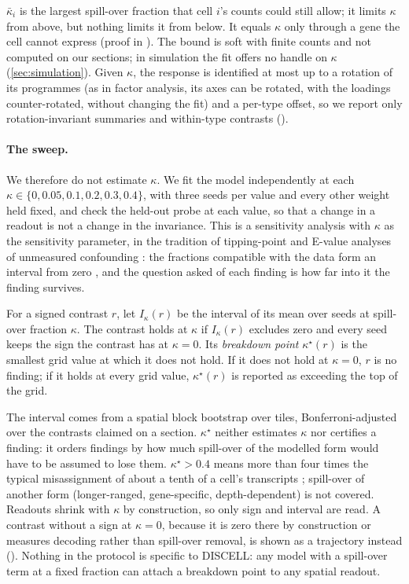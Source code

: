 \noindent $\bar\kappa_i$ is the largest spill-over fraction that cell $i$'s counts could still allow; it limits $\kappa$ from above, but nothing limits it from below. It equals $\kappa$ only through a gene the cell cannot express (proof in ). The bound is soft with finite counts and not computed on our sections; in simulation the fit offers no handle on $\kappa$ (\cref{sec:simulation}). Given $\kappa$, the response is identified at most up to a rotation of its programmes (as in factor analysis, its axes can be rotated, with the loadings counter-rotated, without changing the fit) and a per-type offset, so we report only rotation-invariant summaries and within-type contrasts ().

\paragraph{The sweep.}
We therefore do not estimate $\kappa$. We fit the model independently at each $\kappa \in \{0, 0.05, 0.1, 0.2, 0.3, 0.4\}$, with three seeds per value and every other weight held fixed, and check the held-out probe at each value, so that a change in a readout is not a change in the invariance. This is a sensitivity analysis with $\kappa$ as the sensitivity parameter, in the tradition of tipping-point and E-value analyses of unmeasured confounding \citep{rosenbaum2002,vanderweele2017}: the fractions compatible with the data form an interval from zero \citep{manski2003}, and the question asked of each finding is how far into it the finding survives.

\begin{definition}\label{def:breakdown}
For a signed contrast $r$, let $I_\kappa(r)$ be the interval of its mean over seeds at spill-over fraction $\kappa$. The contrast holds at $\kappa$ if $I_\kappa(r)$ excludes zero and every seed keeps the sign the contrast has at $\kappa = 0$. Its \emph{breakdown point} $\kappa^\star(r)$ is the smallest grid value at which it does not hold. If it does not hold at $\kappa = 0$, $r$ is no finding; if it holds at every grid value, $\kappa^\star(r)$ is reported as exceeding the top of the grid.
\end{definition}

\noindent The interval comes from a spatial block bootstrap over tiles, Bonferroni-adjusted over the contrasts claimed on a section. $\kappa^\star$ neither estimates $\kappa$ nor certifies a finding: it orders findings by how much spill-over of the modelled form would have to be assumed to lose them. $\kappa^\star > 0.4$ means more than four times the typical misassignment of about a tenth of a cell's transcripts \citep{yang2025mistic}; spill-over of another form (longer-ranged, gene-specific, depth-dependent) is not covered. Readouts shrink with $\kappa$ by construction, so only sign and interval are read. A contrast without a sign at $\kappa = 0$, because it is zero there by construction or measures decoding rather than spill-over removal, is shown as a trajectory instead (). Nothing in the protocol is specific to DISCELL: any model with a spill-over term at a fixed fraction can attach a breakdown point to any spatial readout.
